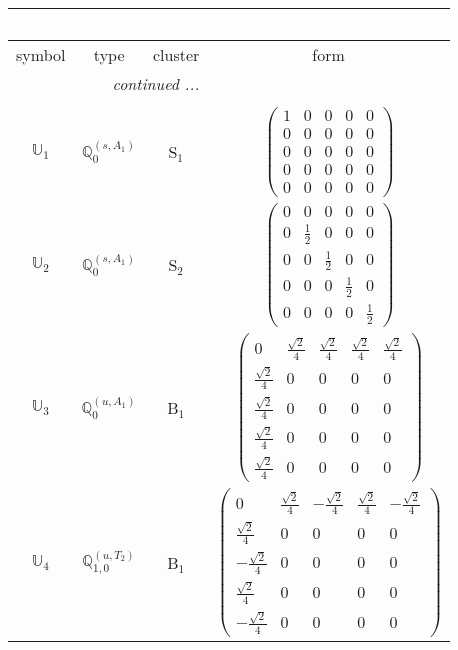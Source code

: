 \documentclass[fleqn,10pt,landscape]{article}
\begin{document}
\begin{itemize}
\begin{center}
\begin{longtable}{c|c|c|c}
\multicolumn{3}{l}{\tablename\ \thetable{}} \\
 \hline \hline
symbol & type & cluster & form \\ \hline \endhead

 \hline \hline
\multicolumn{3}{r}{\footnotesize\it continued ...} \\ \endfoot

 \hline \hline
\multicolumn{3}{r}{} \\ \endlastfoot

$ \mathbb{U}_{1} $ & $\mathbb{Q}_{0}^{(s,A_{1})}$ & S$_{1}$ & $\begin{pmatrix} 1 & 0 & 0 & 0 & 0 \\ 0 & 0 & 0 & 0 & 0 \\ 0 & 0 & 0 & 0 & 0 \\ 0 & 0 & 0 & 0 & 0 \\ 0 & 0 & 0 & 0 & 0 \end{pmatrix}$ \\ \hline
$ \mathbb{U}_{2} $ & $\mathbb{Q}_{0}^{(s,A_{1})}$ & S$_{2}$ & $\begin{pmatrix} 0 & 0 & 0 & 0 & 0 \\ 0 & \frac{1}{2} & 0 & 0 & 0 \\ 0 & 0 & \frac{1}{2} & 0 & 0 \\ 0 & 0 & 0 & \frac{1}{2} & 0 \\ 0 & 0 & 0 & 0 & \frac{1}{2} \end{pmatrix}$ \\ \hline
$ \mathbb{U}_{3} $ & $\mathbb{Q}_{0}^{(u,A_{1})}$ & B$_{1}$ & $\begin{pmatrix} 0 & \frac{\sqrt{2}}{4} & \frac{\sqrt{2}}{4} & \frac{\sqrt{2}}{4} & \frac{\sqrt{2}}{4} \\ \frac{\sqrt{2}}{4} & 0 & 0 & 0 & 0 \\ \frac{\sqrt{2}}{4} & 0 & 0 & 0 & 0 \\ \frac{\sqrt{2}}{4} & 0 & 0 & 0 & 0 \\ \frac{\sqrt{2}}{4} & 0 & 0 & 0 & 0 \end{pmatrix}$ \\
$ \mathbb{U}_{4} $ & $\mathbb{Q}_{1,0}^{(u,T_{2})}$ & B$_{1}$ & $\begin{pmatrix} 0 & \frac{\sqrt{2}}{4} & - \frac{\sqrt{2}}{4} & \frac{\sqrt{2}}{4} & - \frac{\sqrt{2}}{4} \\ \frac{\sqrt{2}}{4} & 0 & 0 & 0 & 0 \\ - \frac{\sqrt{2}}{4} & 0 & 0 & 0 & 0 \\ \frac{\sqrt{2}}{4} & 0 & 0 & 0 & 0 \\ - \frac{\sqrt{2}}{4} & 0 & 0 & 0 & 0 \end{pmatrix}$ \\

\end{longtable}
\end{center}
\end{itemize}
\end{document}
